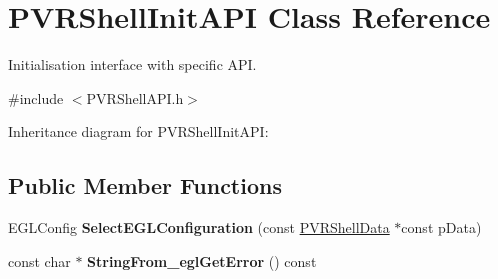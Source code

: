 \hypertarget{class_p_v_r_shell_init_a_p_i}{\section{P\+V\+R\+Shell\+Init\+A\+P\+I Class Reference}
\label{class_p_v_r_shell_init_a_p_i}
}


Initialisation interface with specific A\+P\+I.  




{\ttfamily \#include $<$P\+V\+R\+Shell\+A\+P\+I.\+h$>$}



Inheritance diagram for P\+V\+R\+Shell\+Init\+A\+P\+I\+:
\subsection*{Public Member Functions}
\begin{DoxyCompactItemize}
\item 
\hypertarget{class_p_v_r_shell_init_a_p_i_a6724b96485404272971b091e429d70ea}{E\+G\+L\+Config {\bfseries Select\+E\+G\+L\+Configuration} (const \hyperlink{struct_p_v_r_shell_data}{P\+V\+R\+Shell\+Data} $\ast$const p\+Data)}\label{class_p_v_r_shell_init_a_p_i_a6724b96485404272971b091e429d70ea}

\item 
\hypertarget{class_p_v_r_shell_init_a_p_i_a236a482147cb8c8dff352c080f253db0}{const char $\ast$ {\bfseries String\+From\+\_\+egl\+Get\+Error} () const }\label{class_p_v_r_shell_init_a_p_i_a236a482147cb8c8dff352c080f253db0}

\end{DoxyCompactItemize}
